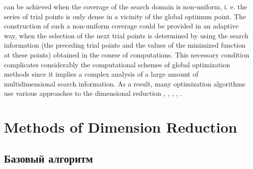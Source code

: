 \documentclass[runningheads]{llncs}
\begin{document}
can be achieved when the coverage of the search domain is non-uniform, i. e. the series
of trial points is only dense in a vicinity of the global optimum point. The construction
of such a non-uniform coverage could be provided in an adaptive way, when the selection
of the next trial points is determined by using the search information (the preceding
trial points and the values of the minimized function at these points) obtained in the course
of computations. This necessary condition complicates considerably the computational schemes
of global optimization methods since it implies a complex analysis of a large amount
of multidimensional search information. As a result, many optimization algorithms use
various approaches to the dimensional reduction \cite{pinterGO}, \cite{sergeyevStronginLera2013}, \cite{strongin1978}, \cite{stronginGergelBarkalovParGO}, \cite{strSergGO}.

\section{Methods of Dimension Reduction}
\subsection{Базовый алгоритм}
\end{document}
